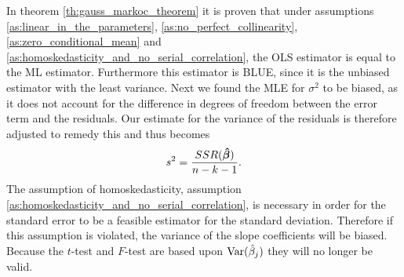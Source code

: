In theorem \ref{th:gauss_markoc_theorem} it is proven that under assumptions \ref{as:linear_in_the_parameters}, \ref{as:no_perfect_collinearity}, \ref{as:zero_conditional_mean} and \ref{as:homoskedasticity_and_no_serial_correlation}, the OLS estimator is equal to the ML estimator.
Furthermore this estimator is BLUE, since it is the unbiased estimator with the least variance.
Next we found the MLE for $\sigma^2$ to be biased, as it does not account for the difference in degrees of freedom between the error term and the residuals.
Our estimate for the variance of the residuals is therefore adjusted to remedy this and thus becomes
\begin{align*} \label{eq:sigma_hat_2_n-k-1}
    s^2 = \frac{SSR(\operatorname{\boldsymbol{\hat{\beta}}})}{n - k - 1}.
\end{align*}
The assumption of homoskedasticity, assumption \ref{as:homoskedasticity_and_no_serial_correlation}, is necessary in order for the standard error to be a feasible estimator for the standard deviation.
Therefore if this assumption is violated, the variance of the slope coefficients will be biased.
Because the $t$-test and $F$-test are based upon $\operatorname{\text{Var}}(\hat{\beta}_j)$ they will no longer be valid. 

